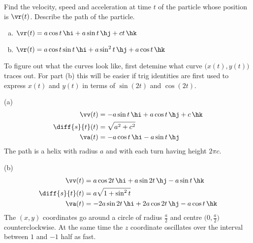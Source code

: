 \begin{question}
Find the velocity, speed and acceleration at time $t$ of
the particle whose position is $\vr(t)$. Describe the path of the particle.
\begin{enumerate}[(a)]
\item
$\vr(t)= a \cos t\,\hi + a\sin t\,\hj + ct\,\hk$
\item
$\vr(t)= a \cos t\sin t\,\hi + a\sin^2 t\,\hj + a\cos t\,\hk$
\end{enumerate}
\end{question}

\begin{hint}
To figure out what the curves look like, first detemine what curve
$\big(x(t),y(t)\big)$ traces out. For part (b) this will be easier
if trig identities are first used to express $x(t)$ and $y(t)$ in terms of
$\sin(2t)$ and $\cos(2t)$.
\end{hint}

\begin{answer}
(a) 
\begin{align*}
\vv(t)&= -a \sin t\,\hi+a\cos t\,\hj+c\,\hk\\
\diff{s}{t}(t)&= \sqrt{a^2+c^2}\\
\va(t)&= -a \cos t\,\hi-a\sin t\,\hj
\end{align*}
The path is a helix with radius $a$ and with each turn having height $2\pi c$.

(b)
\begin{align*}
\vv(t)&= a \cos 2t\,\hi +a\sin 2t\,\hj-a\sin t\,\hk\\
\diff{s}{t}(t)&= a\sqrt{1+\sin^2t}\\
\va(t)&= -2a \sin 2t\,\hi +2a\cos 2t\,\hj-a\cos t\,\hk
\end{align*}
The $(x,y)$ coordinates go around a circle of radius $\frac{a}{2}$ and
centre $\big(0,\frac{a}{2}\big)$ counterclockwise. At the same time the $z$ coordinate oscillates over the interval between $1$ and $-1$ half as fast.
\end{answer}

